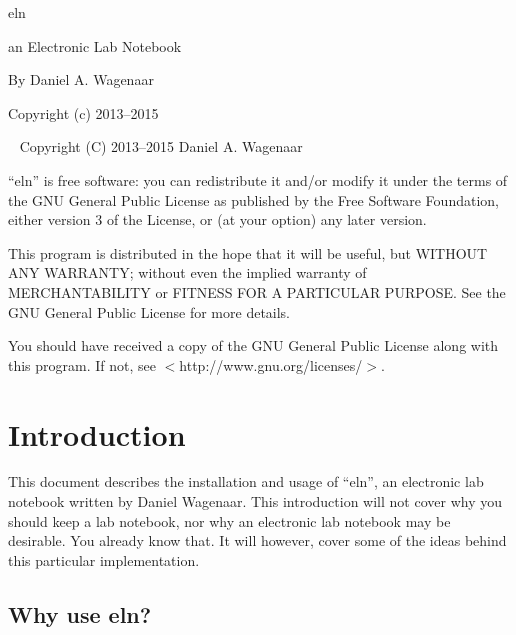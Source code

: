 \documentclass[11pt]{report}
\begin{document}
\thispagestyle{empty}
\begin{centering}
  {\Huge eln}
  \vskip30pt

  {\Large an Electronic Lab Notebook}
  \vskip60pt

  {\large By Daniel A. Wagenaar}
  \vfill
  
  {Copyright (c) 2013--2015}
  
\end{centering}
\pagebreak
~
\vfill
\noindent Copyright (C) 2013--2015 Daniel A. Wagenaar\medskip

``eln'' is free software: you can redistribute it and/or modify
it under the terms of the GNU General Public License as published by
the Free Software Foundation, either version 3 of the License, or
(at your option) any later version.

This program is distributed in the hope that it will be useful,
but WITHOUT ANY WARRANTY; without even the implied warranty of
MERCHANTABILITY or FITNESS FOR A PARTICULAR PURPOSE.  See the
GNU General Public License for more details.

You should have received a copy of the GNU General Public License
along with this program.  If not, see $<$http://www.gnu.org/licenses/$>$.
\pagebreak

\chapter{Introduction}

This document describes the installation and usage of ``eln'', an
electronic lab notebook written by Daniel Wagenaar.  This introduction
will not cover why you should keep a lab notebook, nor why an
electronic lab notebook may be desirable. You already know that.  It
will however, cover some of the ideas behind this particular
implementation.

\section{Why use eln?}
\end{document}

